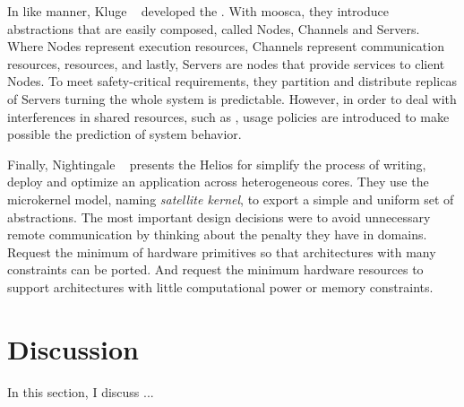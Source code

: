 	In like manner, Kluge \etal~\cite{Kluge2014} developed the \moosca.
	With moosca, they introduce abstractions that are easily composed, called Nodes,
	Channels and Servers.
	Where Nodes represent execution resources, Channels represent communication
	resources, \ie \noc resources, and lastly, Servers are nodes that provide
	services to client Nodes.
	To meet safety-critical requirements, they partition \manycore and distribute
	replicas of Servers turning the whole system is predictable.
	However, in order to deal with interferences in shared resources, such as \noc,
	usage policies are introduced to make possible the prediction of system behavior.

	Finally, Nightingale \etal~\cite{nightingale2009} presents the Helios \os for
	simplify the process of writing, deploy and optimize an application across
	heterogeneous cores.
	They use the microkernel model, naming \textit{satellite kernel}, to export
	a simple and uniform set of \os abstractions.
	The most important design decisions were to avoid unnecessary remote communication
	by thinking about the penalty they have in \numa domains.
	Request the minimum of hardware primitives so that architectures with many
	constraints can be ported.
	And request the minimum hardware resources to support architectures with little
	computational power or memory constraints.

\section{Discussion}
	In this section, I discuss ...